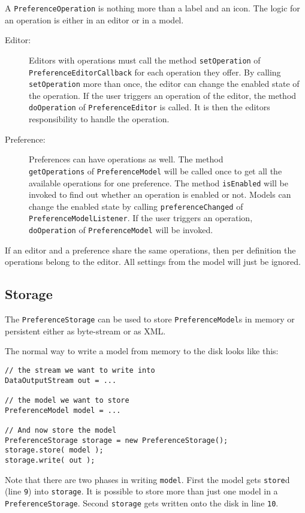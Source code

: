 \documentclass[a4paper,10pt]{article}
\newcommand{\src}[1]{\lstinline[basicstyle=\normalsize\ttfamily,keywordstyle=\normalsize\ttfamily,identifierstyle=\normalsize\ttfamily]|#1|}
\begin{document}
A \src{PreferenceOperation} is nothing more than a label and an icon. The logic for an operation is either in an editor or in a model.

\begin{description}
 \item[Editor:] Editors with operations must call the method \src{setOperation} of \\\src{PreferenceEditorCallback} for each operation they offer. By calling \src{setOperation} more than once, the editor can change the enabled state of the operation. If the user triggers an operation of the editor, the method \src{doOperation} of \src{PreferenceEditor} is called. It is then the editors responsibility to handle the operation.
 \item[Preference:] Preferences can have operations as well. The method \\\src{getOperations} of \src{PreferenceModel} will be called once to get all the available operations for one preference. The method \src{isEnabled} will be invoked to find out whether an operation is enabled or not. Models can change the enabled state by calling \src{preferenceChanged} of \\\src{PreferenceModelListener}. If the user triggers an operation, \\\src{doOperation} of \src{PreferenceModel} will be invoked.
\end{description}
If an editor and a preference share the same operations, then per definition the operations belong to the editor. All settings from the model will just be ignored.

\subsection{Storage}
The \src{PreferenceStorage} can be used to store \src{PreferenceModel}s in memory or persistent either as byte-stream or as XML.

The normal way to write a model from memory to the disk looks like this:
\begin{lstlisting}
// the stream we want to write into
DataOutputStream out = ...

// the model we want to store
PreferenceModel model = ...

// And now store the model
PreferenceStorage storage = new PreferenceStorage();
storage.store( model );
storage.write( out );
\end{lstlisting}
Note that there are two phases in writing \src{model}. First the model gets \src{store}d (line \src{9}) into \src{storage}. It is possible to store more than just one model in a \src{PreferenceStorage}. Second \src{storage} gets written onto the disk in line \src{10}.
\end{document}
